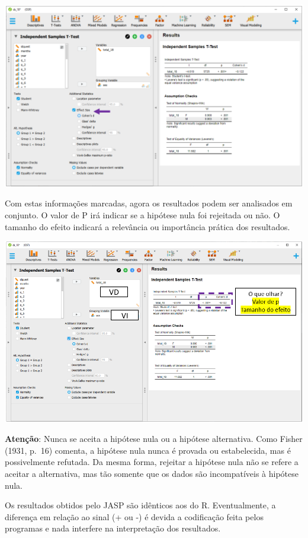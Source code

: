 \documentclass[
]{book}
\newenvironment{warning}{
  \definecolor{shadecolor}{rgb}{0, 0, 0}  %
  \color{white}
  \begin{shaded}}
 {\end{shaded}}
\begin{document}
\includegraphics{./img/cap_testet_tamanho_do_efeito.png}

Com estas informações marcadas, agora os resultados podem ser analisados em conjunto. O valor de P irá indicar se a hipótese nula foi rejeitada ou não. O tamanho do efeito indicará a relevância ou importância prática dos resultados.

\includegraphics{./img/cap_testet_resultados.png}

\begin{warning}

\textbf{Atenção}: Nunca se aceita a hipótese nula ou a hipótese alternativa. Como Fisher (1931, p.~16) comenta, a hipótese nula nunca é provada ou estabelecida, mas é possivelmente refutada. Da mesma forma, rejeitar a hipótese nula não se refere a aceitar a alternativa, mas tão somente que os dados são incompatíveis à hipótese nula.

\end{warning}

Os resultados obtidos pelo JASP são idênticos aos do R. Eventualmente, a diferença em relação ao sinal (+ ou -) é devida a codificação feita pelos programas e nada interfere na interpretação dos resultados.
\end{document}
